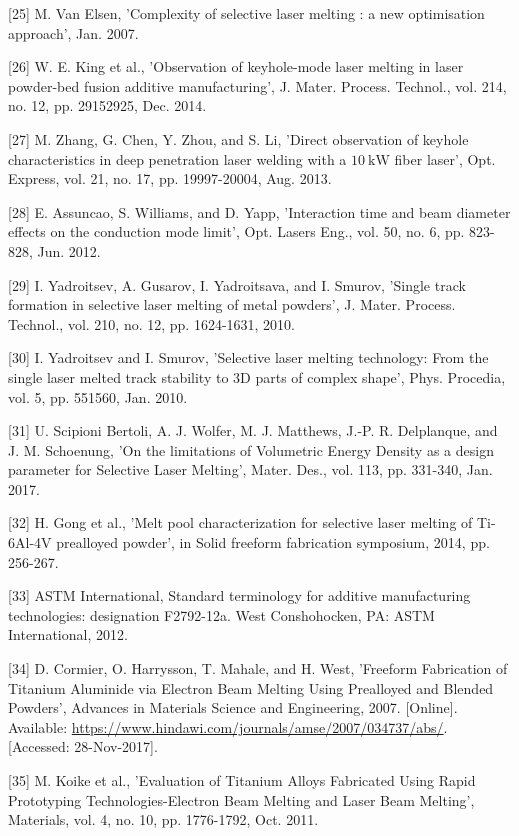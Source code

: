 \documentclass[10pt]{article}
\begin{document}
[25] M. Van Elsen, 'Complexity of selective laser melting : a new optimisation approach', Jan. 2007.

[26] W. E. King et al., 'Observation of keyhole-mode laser melting in laser powder-bed fusion additive manufacturing', J. Mater. Process. Technol., vol. 214, no. 12, pp. 29152925, Dec. 2014.

[27] M. Zhang, G. Chen, Y. Zhou, and S. Li, 'Direct observation of keyhole characteristics in deep penetration laser welding with a $10 \mathrm{~kW}$ fiber laser', Opt. Express, vol. 21, no. 17, pp. 19997-20004, Aug. 2013.

[28] E. Assuncao, S. Williams, and D. Yapp, 'Interaction time and beam diameter effects on the conduction mode limit', Opt. Lasers Eng., vol. 50, no. 6, pp. 823-828, Jun. 2012.

[29] I. Yadroitsev, A. Gusarov, I. Yadroitsava, and I. Smurov, 'Single track formation in selective laser melting of metal powders', J. Mater. Process. Technol., vol. 210, no. 12, pp. 1624-1631, 2010.

[30] I. Yadroitsev and I. Smurov, 'Selective laser melting technology: From the single laser melted track stability to 3D parts of complex shape', Phys. Procedia, vol. 5, pp. 551560, Jan. 2010.

[31] U. Scipioni Bertoli, A. J. Wolfer, M. J. Matthews, J.-P. R. Delplanque, and J. M. Schoenung, 'On the limitations of Volumetric Energy Density as a design parameter for Selective Laser Melting', Mater. Des., vol. 113, pp. 331-340, Jan. 2017.

[32] H. Gong et al., 'Melt pool characterization for selective laser melting of Ti-6Al-4V prealloyed powder', in Solid freeform fabrication symposium, 2014, pp. 256-267.

[33] ASTM International, Standard terminology for additive manufacturing technologies: designation F2792-12a. West Conshohocken, PA: ASTM International, 2012.

[34] D. Cormier, O. Harrysson, T. Mahale, and H. West, 'Freeform Fabrication of Titanium Aluminide via Electron Beam Melting Using Prealloyed and Blended Powders', Advances in Materials Science and Engineering, 2007. [Online]. Available: \href{https://www.hindawi.com/journals/amse/2007/034737/abs/}{https://www.hindawi.com/journals/amse/2007/034737/abs/}. [Accessed: 28-Nov-2017].

[35] M. Koike et al., 'Evaluation of Titanium Alloys Fabricated Using Rapid Prototyping Technologies-Electron Beam Melting and Laser Beam Melting', Materials, vol. 4, no. 10, pp. 1776-1792, Oct. 2011.
\end{document}
